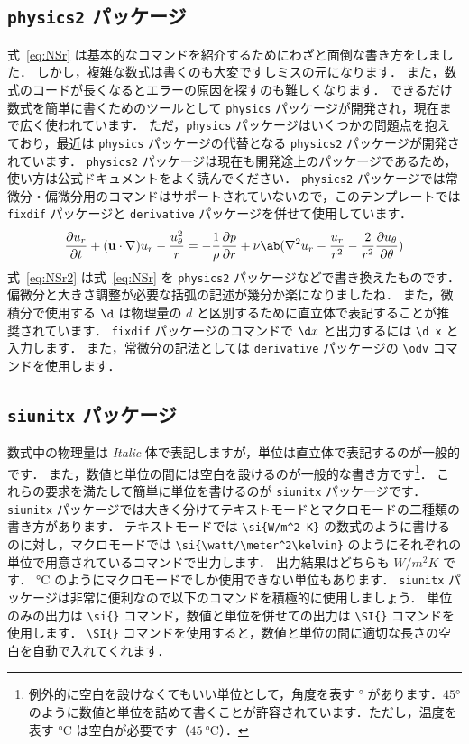 \subsection{\texttt{physics2} パッケージ}
\label{ssec:physics2}

式~\eqref{eq:NSr} は基本的なコマンドを紹介するためにわざと面倒な書き方をしました．
しかし，複雑な数式は書くのも大変ですしミスの元になります．
また，数式のコードが長くなるとエラーの原因を探すのも難しくなります．
できるだけ数式を簡単に書くためのツールとして \verb|physics| パッケージが開発され，現在まで広く使われています．
ただ，\verb|physics| パッケージはいくつかの問題点を抱えており，最近は \verb|physics| パッケージの代替となる \verb|physics2| パッケージが開発されています．
\verb|physics2| パッケージは現在も開発途上のパッケージであるため，使い方は公式ドキュメントをよく読んでください．
\verb|physics2| パッケージでは常微分・偏微分用のコマンドはサポートされていないので，このテンプレートでは \verb|fixdif| パッケージと \verb|derivative| パッケージを併せて使用しています．
\begin{equation}
    \pdv{u_r}{t} + (\mathbf{u}\cdot\nabla)u_r - \frac{u_\theta^2}{r} = -\frac{1}{\rho}\pdv{p}{r} + \nu\ab(\nabla^2 u_r - \frac{u_r}{r^2} - \frac{2}{r^2}\pdv{u_\theta}{\theta})
    \label{eq:NSr2}
\end{equation}
式~\eqref{eq:NSr2} は式~\eqref{eq:NSr} を \verb|physics2| パッケージなどで書き換えたものです．
偏微分と大きさ調整が必要な括弧の記述が幾分か楽になりましたね．
また，微積分で使用する $\d$ は物理量の $d$ と区別するために直立体で表記することが推奨されています．
\verb|fixdif| パッケージのコマンドで $\d x$ と出力するには \verb|\d x| と入力します．
また，常微分の記法としては \verb|derivative| パッケージの \verb|\odv| コマンドを使用します．

\subsection{\texttt{siunitx} パッケージ}
\label{ssec:siunitx}

数式中の物理量は \textit{Italic} 体で表記しますが，単位は直立体で表記するのが一般的です．
また，数値と単位の間には空白を設けるのが一般的な書き方です\footnote{例外的に空白を設けなくてもいい単位として，角度を表す $\si{\degree}$ があります．$\ang{45}$ のように数値と単位を詰めて書くことが許容されています．ただし，温度を表す $\si{\degreeCelsius}$ は空白が必要です（$\SI{45}{\degreeCelsius}$）．}．
これらの要求を満たして簡単に単位を書けるのが \verb|siunitx| パッケージです．
\verb|siunitx| パッケージでは大きく分けてテキストモードとマクロモードの二種類の書き方があります．
テキストモードでは \verb|\si{W/m^2 K}| の数式のように書けるのに対し，マクロモードでは \verb|\si{\watt/\meter^2\kelvin}| のようにそれぞれの単位で用意されているコマンドで出力します．
出力結果はどちらも $\si{W/m^2 K}$ です．
$\si{\degreeCelsius}$ のようにマクロモードでしか使用できない単位もあります．
\verb|siunitx| パッケージは非常に便利なので以下のコマンドを積極的に使用しましょう．
単位のみの出力は \verb|\si{}| コマンド，数値と単位を併せての出力は \verb|\SI{}| コマンドを使用します．
\verb|\SI{}| コマンドを使用すると，数値と単位の間に適切な長さの空白を自動で入れてくれます．

